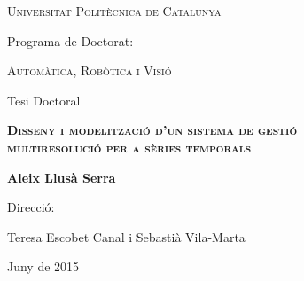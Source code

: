\begin{titlepage}
  \begin{center} 

   

    {\Large \scshape Universitat Politècnica de Catalunya} \vskip 1cm 

    {Programa de Doctorat:} \vskip 0.5cm 
    
    {\scshape Automàtica, Robòtica i Visió} \vfill%

    {Tesi Doctoral} \vskip 1cm 
    
    {\scshape \bfseries \Large Disseny i modelització d'un sistema de gestió\\
 multiresolució per a sèries temporals} \vskip 2cm

    {\bfseries Aleix Llusà Serra} \vfill%

    {Direcció:}
       
    {Teresa Escobet Canal i
    Sebastià Vila-Marta}  \vskip 1cm 

    {Juny de 2015}

\end{center}
\end{titlepage}
